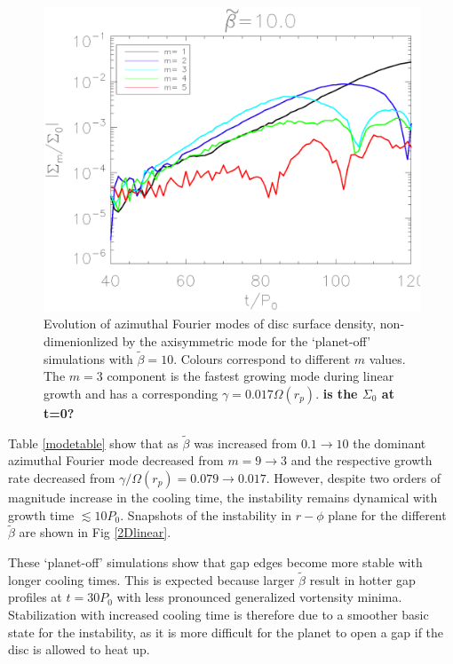 \begin{figure}
  \includegraphics[width=\linewidth,clip=true,trim=1.2cm
    0cm 0cm 0cm]{figures/linear_stability}
  \caption{Evolution of azimuthal Fourier modes of disc surface
    density, non-dimenionlized by the axisymmetric mode for the
    `planet-off' simulations with $\tilde{\beta}=10$. Colours correspond
    to different $m$ values. The $m=3$ component is the fastest growing
    mode during linear growth and has a corresponding
    $\gamma=0.017\Omega(r_p)$. {\bf is the $\Sigma_0$ at
      t=0?} \label{linearmodes}}  
\end{figure}


Table \ref{modetable} show that as
$\tilde{\beta}$ was increased from $ 0.1\rightarrow10$ the dominant
azimuthal Fourier mode decreased from $ m=9\rightarrow3$ and the
respective growth rate decreased from $ \gamma/\Omega(r_p)=0.079
\rightarrow 0.017$. However, despite two orders of magnitude increase in the
cooling time, the instability remains dynamical with growth time
$\lesssim 10P_0$. Snapshots of the instability in $r-\phi$ plane for
the different $\tilde\beta$ are shown in Fig \ref{2Dlinear}. 

These `planet-off' simulations show that gap edges become more stable with
longer cooling times. This is expected because larger $\tilde{\beta}$
result in hotter gap profiles at $t=30P_0$ with less pronounced
generalized vortensity minima. Stabilization with increased
cooling time is therefore due to a smoother basic state for the
instability, as it is more difficult for the planet to open a gap if
the disc is allowed to heat up. 
 

